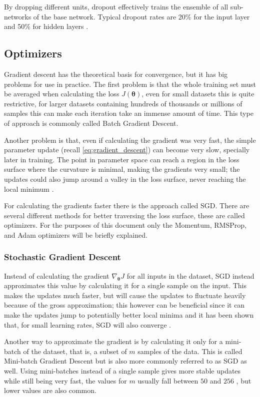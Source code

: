 By dropping different units, dropout effectively trains the ensemble of all sub-networks of the base network. Typical dropout rates are 20\% for the input layer and 50\% for hidden layers \cite[p. 255, 257]{deepLearningBook2016}.

\subsection{Optimizers} \label{sub:optimizers}
Gradient descent has the theoretical basis for convergence, but it has big problems for use in practice. The first problem is that the whole training set must be averaged when calculating the loss $J(\bm{\theta})$, even for small datasets this is quite restrictive, for larger datasets containing hundreds of thousands or millions of samples this can make each iteration take an immense amount of time. This type of approach is commonly called Batch Gradient Descent.

Another problem is that, even if calculating the gradient was very fast, the simple parameter update (recall \autoref{eq:gradient_descent}) can become very slow, specially later in training. The point in parameter space can reach a region in the loss surface where the curvature is minimal, making the gradients very small; the updates could also jump around a valley in the loss surface, never reaching the local minimum \cite{momentumWorks2017}.

For calculating the gradients faster there is the approach called \gls{SGD}. There are several different methods for better traversing the loss surface, these are called optimizers. For the purposes of this document only the Momentum, RMSProp, and \gls{Adam} optimizers will be briefly explained.

\subsubsection{Stochastic Gradient Descent}
Instead of calculating the gradient $\nabla_{\bm{\theta}} J$ for all inputs in the dataset, \gls{SGD} instead approximates this value by calculating it for a single sample on the input. This makes the updates much faster, but will cause the updates to fluctuate heavily because of the gross approximation; this however can be beneficial since it can make the updates jump to potentially better local minima and it has been shown that, for small learning rates, \gls{SGD} will also converge \cite{optimizers2016}.

Another way to approximate the gradient is by calculating it only for a mini-batch of the dataset, that is, a subset of $m$ samples of the data. This is called Mini-batch Gradient Descent but is also more commonly referred to as \gls{SGD} as well. Using mini-batches instead of a single sample gives more stable updates while still being very fast, the values for $m$ usually fall between $50$ and $256$ \cite{optimizers2016}, but lower values are also common.

